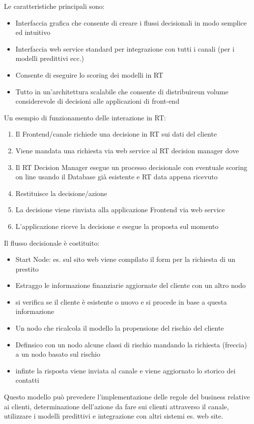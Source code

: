 \documentclass[11pt]{article}
\newenvironment{nosepitemize}{\begin{itemize}[noitemsep,topsep=0ex]}{\end{itemize}}
\begin{document}
Le caratteristiche principali sono:
\begin{nosepitemize}
	\item Interfaccia grafica che consente di creare i flussi decisionali in modo semplice ed intuitivo
	\item Interfaccia web service standard per integrazione con tutti i canali (per i modelli predittivi ecc.)
	\item Consente di eseguire lo scoring dei modelli in RT
	\item Tutto in un'architettura scalabile che consente di distribuireun volume considerevole di decisioni alle applicazioni di front-end
\end{nosepitemize}
Un esempio di funzionamento delle interazione in RT:
\begin{enumerate}[noitemsep,topsep=0ex]
	\item Il Frontend/canale richiede una decisione in RT sui dati del cliente
	\item Viene mandata una richiesta via web service al RT decision manager dove
	\item Il RT Decision Manager esegue un processo decisionale con eventuale scoring on line usando il Database già esistente e RT data appena ricevuto
	\item Restituisce la decisione/azione
	\item La decisione viene rinviata alla applicazione Frontend via web service
	\item L'applicazione riceve la decisione e esegue la proposta sul momento
\end{enumerate} 

Il flusso decisionale è costituito:
\begin{nosepitemize}
	\item Start Node: es. sul sito web viene compilato il form per la richiesta di un prestito
	\item Estraggo le informazione finanziarie aggiornate del cliente con un altro nodo
	\item si verifica se il cliente è esistente o nuovo e si procede in base a questa informazione
	\item Un nodo che ricalcola il modello la propensione del rischio del cliente
	\item Definsico con un nodo alcune classi di rischio mandando la richiesta (freccia) a un nodo basato sul rischio
	\item infinte la risposta viene inviata al canale e viene aggiornato lo storico dei contatti
\end{nosepitemize}
Questo modello può prevedere l'implementazione delle regole del business relative ai clienti, determinazione dell'azione da fare sui clienti attraverso il canale, utilizzare i modelli predittivi e integrazione con altri sistemi es. web site.
\end{document}
